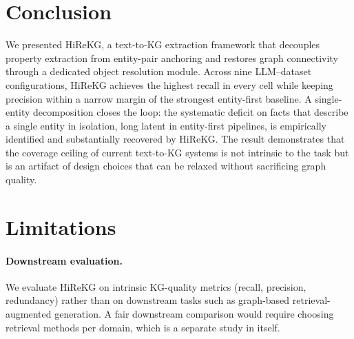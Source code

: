 \documentclass[11pt]{article}
\begin{document}
\section{Conclusion}
\label{sec:conclusion}
We presented HiReKG, a text-to-KG extraction framework that decouples property extraction from entity-pair anchoring and restores graph connectivity through a dedicated object resolution module. Across nine LLM--dataset configurations, HiReKG achieves the highest recall in every cell while keeping precision within a narrow margin of the strongest entity-first baseline. A single-entity decomposition closes the loop: the systematic deficit on facts that describe a single entity in isolation, long latent in entity-first pipelines, is empirically identified and substantially recovered by HiReKG. The result demonstrates that the coverage ceiling of current text-to-KG systems is not intrinsic to the task but is an artifact of design choices that can be relaxed without sacrificing graph quality.



\section*{Limitations}

\paragraph{Downstream evaluation.} We evaluate HiReKG on intrinsic KG-quality metrics (recall, precision, redundancy) rather than on downstream tasks such as graph-based retrieval-augmented generation. A fair downstream comparison would require choosing retrieval methods per domain, which is a separate study in itself.
\end{document}
